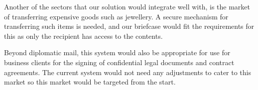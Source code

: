 Another of the sectors that our solution would integrate well with, is the market of transferring expensive goods such as jewellery. A secure mechanism for transferring such items is needed, and our briefcase would fit the requirements for this as only the recipient has access to the contents.

Beyond diplomatic mail, this system would also be appropriate for use for business clients for the signing of confidential legal documents and contract agreements. The current system would not need any adjustments to cater to this market so this market would be targeted from the start. 
